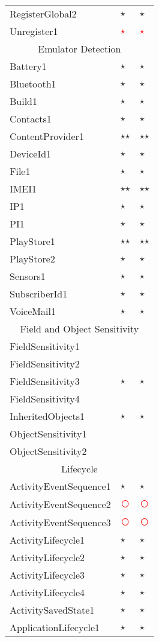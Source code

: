 \documentclass[../draft.tex]{subfiles}
\newcommand{\fp}{{\fontfamily{cmr}\selectfont\textcolor{white}{\textcircled{\textcolor{red}{$\star$}}}}}
\newcommand{\fn}{{\fontfamily{cmr}\selectfont\textcolor{red}{\textcircled{ }}}}
\newcommand{\tp}[0]{{\fontfamily{cmr}\selectfont\textcircled{$\star$}}}
\newcommand{\tsub}[1]{\multicolumn{3}{c}{#1}\\\hline}
\begin{document}
\begin{longtable}{l | l | l}
        RegisterGlobal2 & \tp & \tp\\
        Unregister1 & \fp & \fp\\
        \hline
        \tsub{Emulator Detection}
        Battery1 & \tp & \tp\\
        Bluetooth1 & \tp & \tp\\
        Build1 & \tp & \tp\\
        Contacts1 & \tp & \tp\\
        ContentProvider1 & \tp \tp & \tp \tp\\
        DeviceId1 & \tp & \tp\\
        File1 & \tp & \tp\\
        IMEI1 & \tp \tp & \tp \tp\\
        IP1 & \tp & \tp\\
        PI1 & \tp & \tp\\
        PlayStore1 & \tp \tp & \tp \tp\\
        PlayStore2 & \tp & \tp\\
        Sensors1 & \tp & \tp\\
        SubscriberId1 & \tp & \tp\\
        VoiceMail1 & \tp & \tp\\
        \hline
        \tsub{Field and Object Sensitivity}
        FieldSensitivity1 & & \\
        FieldSensitivity2 & & \\
        FieldSensitivity3 & \tp & \tp\\
        FieldSensitivity4 & & \\
        InheritedObjects1 & \tp & \tp\\
        ObjectSensitivity1 & & \\
        ObjectSensitivity2 & & \\
        \hline
        \tsub{Lifecycle}
        ActivityEventSequence1 & \tp & \tp\\
        ActivityEventSequence2 & \fn & \fn\\
        ActivityEventSequence3 & \fn & \fn\\
        ActivityLifecycle1 & \tp & \tp\\
        ActivityLifecycle2 & \tp & \tp\\
        ActivityLifecycle3 & \tp & \tp\\
        ActivityLifecycle4 & \tp & \tp\\
        ActivitySavedState1 & \tp & \tp\\
        ApplicationLifecycle1 & \tp & \tp\\

\end{longtable}
\end{document}
